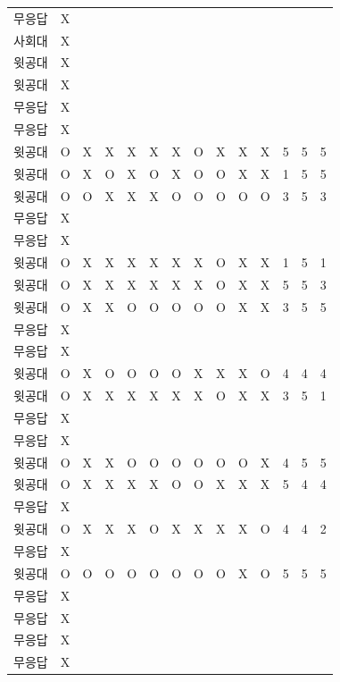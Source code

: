 \documentclass[11pt,a4paper]{article}
\begin{document}
\begin{center}
\begin{supertabular}{ | p{2cm} | x{1.6cm} | x{0.5cm} | x{0.5cm} | x{0.5cm} | x{0.5cm} | x{0.5cm} | x{0.5cm} | x{0.5cm} | x{0.5cm} | x{0.5cm} | x{0.5cm} | x{0.5cm} | x{0.5cm} | }
무응답 & X & & & & & & & & & & & & \\
사회대 & X & & & & & & & & & & & & \\
윗공대 & X & & & & & & & & & & & & \\
윗공대 & X & & & & & & & & & & & & \\
무응답 & X & & & & & & & & & & & & \\
무응답 & X & & & & & & & & & & & & \\
윗공대 & O & X & X & X & X & X & O & X & X & X & 5 & 5 & 5 \\
윗공대 & O & X & O & X & O & X & O & O & X & X & 1 & 5 & 5 \\
윗공대 & O & O & X & X & X & O & O & O & O & O & 3 & 5 & 3 \\
무응답 & X & & & & & & & & & & & & \\
무응답 & X & & & & & & & & & & & & \\
윗공대 & O & X & X & X & X & X & X & O & X & X & 1 & 5 & 1 \\
윗공대 & O & X & X & X & X & X & X & O & X & X & 5 & 5 & 3 \\
윗공대 & O & X & X & O & O & O & O & O & X & X & 3 & 5 & 5 \\
무응답 & X & & & & & & & & & & & & \\
무응답 & X & & & & & & & & & & & & \\
윗공대 & O & X & O & O & O & O & X & X & X & O & 4 & 4 & 4 \\
윗공대 & O & X & X & X & X & X & X & O & X & X & 3 & 5 & 1 \\
무응답 & X & & & & & & & & & & & & \\
무응답 & X & & & & & & & & & & & & \\
윗공대 & O & X & X & O & O & O & O & O & O & X & 4 & 5 & 5 \\
윗공대 & O & X & X & X & X & O & O & X & X & X & 5 & 4 & 4 \\
무응답 & X & & & & & & & & & & & & \\
윗공대 & O & X & X & X & O & X & X & X & X & O & 4 & 4 & 2 \\
무응답 & X & & & & & & & & & & & & \\
윗공대 & O & O & O & O & O & O & O & O & X & O & 5 & 5 & 5 \\
무응답 & X & & & & & & & & & & & & \\
무응답 & X & & & & & & & & & & & & \\
무응답 & X & & & & & & & & & & & & \\
무응답 & X & & & & & & & & & & & & \\

\end{supertabular}
\end{center}
\end{document}
